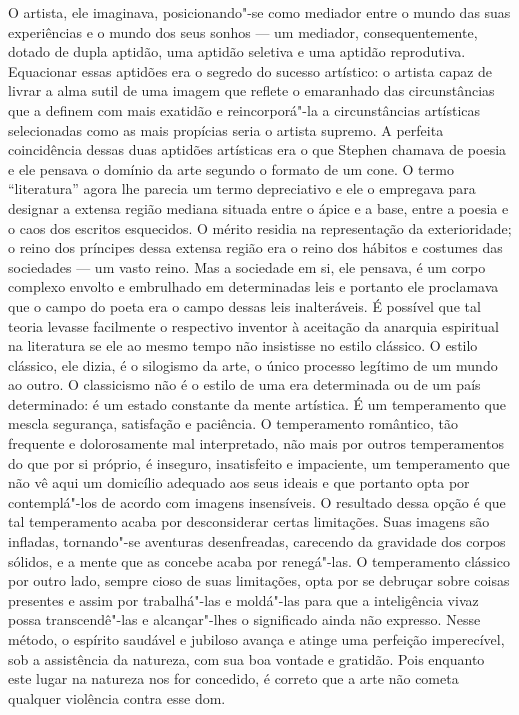 O artista, ele imaginava, posicionando"-se como mediador entre o
mundo das suas experiências e o mundo dos seus sonhos --- \label{um"-mediador} um
mediador, consequentemente, dotado de dupla aptidão, uma aptidão
seletiva e uma aptidão reprodutiva.  Equacionar essas aptidões era o
segredo do sucesso artístico: o artista capaz de livrar a alma sutil de
uma imagem que reflete o emaranhado das circunstâncias que a definem
com mais exatidão e \label{reincorpora"-la} reincorporá"-la a circunstâncias artísticas
selecionadas como as mais propícias seria o artista supremo.  A
perfeita coincidência dessas duas aptidões artísticas era o que Stephen
chamava de poesia e ele pensava o domínio da arte segundo o formato de
um cone.  O termo “literatura” agora lhe parecia um termo depreciativo
e ele o empregava para designar a extensa região mediana situada entre
o ápice e a base, entre a poesia e o caos dos escritos esquecidos.  O
mérito residia na representação da exterioridade; o reino dos príncipes
dessa extensa região era o reino dos hábitos e costumes das \mbox{sociedades}
--- um vasto reino.  Mas a sociedade em si, ele pensava, é um corpo
complexo envolto e embrulhado em determinadas leis e portanto ele
proclamava que o campo do poeta era o campo dessas leis inalteráveis.
É possível que tal teoria levasse facilmente o respectivo inventor à
aceitação da anarquia espiritual na literatura se ele ao mesmo tempo
não insistisse no estilo clássico.  O estilo clássico, ele dizia, é o
silogismo da arte, o único processo legítimo de um mundo ao outro.  O
classicismo não é o estilo de uma era determinada ou de um país
determinado: é um estado constante da mente artística.  É um
temperamento que mescla segurança, satisfação e paciência.  O
temperamento romântico, tão frequente e dolorosamente mal interpretado,
não mais por outros temperamentos do que por si próprio, é inseguro,
insatisfeito e impaciente, um temperamento que não vê aqui um domicílio
adequado aos seus ideais e que portanto opta por contemplá"-los de
acordo com imagens insensíveis.  O resultado dessa opção é que tal
temperamento acaba por desconsiderar certas limitações.  Suas imagens
são infladas, tornando"-se aventuras desenfreadas, carecendo da
gravidade dos corpos sólidos, e a mente que as concebe acaba por
renegá"-las.  O temperamento clássico por outro lado, sempre cioso de
suas limitações, opta por se debruçar sobre coisas presentes e assim
por trabalhá"-las e moldá"-las para que a inteligência vivaz possa
transcendê"-las e alcançar"-lhes o significado ainda não expresso.  Nesse
método, o espírito saudável e jubiloso avança e atinge uma perfeição
imperecível, sob a assistência da natureza, com sua boa vontade e
gratidão.  \label{pois"-enquanto} Pois enquanto este lugar na natureza nos for concedido, é
correto que a arte não cometa qualquer violência contra esse dom.


